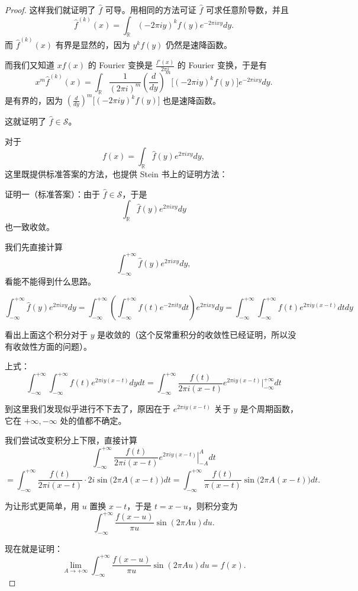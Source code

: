 \documentclass[12pt]{ctexart}  %
\begin{document}
\begin{proof}
这样我们就证明了 \(\hat{f}\) 可导。用相同的方法可证 \(\hat{f}\) 可求任意阶导数，并且
\[
\hat{f}^{(k)}(x) = \int_{\mathbb{R}} (-2\pi i y)^k f(y) e^{-2\pi i x y} dy.
\]
而 \(\hat{f}^{(k)}(x)\) 有界是显然的，因为 \(y^k f(y)\) 仍然是速降函数。

而我们又知道 \(x f(x)\) 的 Fourier 变换是 \(\frac{f'(x)}{2\pi i}\) 的 Fourier 变换，于是有
\[
x^m \hat{f}^{(k)}(x) = \int_{\mathbb{R}} \frac{1}{(2\pi i)^m}\left( \frac{d}{dy} \right)^m \bigl[ (-2\pi i y)^k f(y) \bigr] e^{-2\pi i x y} dy.
\]
是有界的，因为 \(\left( \frac{d}{dy} \right)^m \bigl[ (-2\pi i y)^k f(y) \bigr]\) 也是速降函数。

这就证明了 \(\hat{f} \in \mathcal{S}\)。

对于
\[
f(x) = \int_{\mathbb{R}} \hat{f}(y) e^{2\pi i x y} dy,
\]
这里既提供标准答案的方法，也提供 Stein 书上的证明方法：

证明一（标准答案）：由于 \(\hat{f} \in \mathcal{S}\)，于是
\[
\int_{\mathbb{R}} \hat{f}(y) e^{2\pi i x y} dy
\]
也一致收敛。

我们先直接计算
\[
\int_{-\infty}^{+\infty} \hat{f}(y) e^{2\pi i x y} dy,
\]
看能不能得到什么思路。

\[
\int_{-\infty}^{+\infty} \hat{f}(y) e^{2\pi i x y} dy
= \int_{-\infty}^{+\infty} \left( \int_{-\infty}^{+\infty} f(t) e^{-2\pi i t y} dt \right) e^{2\pi i x y} dy
= \int_{-\infty}^{+\infty} \int_{-\infty}^{+\infty} f(t) e^{2\pi i y (x-t)} dt dy
\]

看出上面这个积分对于 \(y\) 是收敛的（这个反常重积分的收敛性已经证明，所以没有收敛性方面的问题）。

上式：
\[
\int_{-\infty}^{+\infty} \int_{-\infty}^{+\infty} f(t) e^{2\pi i y (x-t)} dy dt
= \int_{-\infty}^{+\infty} \frac{f(t)}{2\pi i (x-t)} e^{2\pi i y (x-t)} \bigg|_{-\infty}^{+\infty} dt
\]

到这里我们发现似乎进行不下去了，原因在于 \(e^{2\pi i y (x-t)}\) 关于 \(y\) 是个周期函数，它在 \(+\infty, -\infty\) 处的值都不确定。

我们尝试改变积分上下限，直接计算
\[
\int_{-\infty}^{+\infty} \frac{f(t)}{2\pi i (x-t)} \left. e^{2\pi i y (x-t)} \right|_{-A}^{A} dt
\]
\[
= \int_{-\infty}^{+\infty} \frac{f(t)}{2\pi i (x-t)} \cdot 2i\sin\bigl(2\pi A (x-t)\bigr) dt
= \int_{-\infty}^{+\infty} \frac{f(t)}{\pi (x-t)} \sin\bigl(2\pi A (x-t)\bigr) dt.
\]

为让形式更简单，用 \(u\) 置换 \(x-t\)，于是 \(t = x-u\)，则积分变为
\[
\int_{-\infty}^{+\infty} \frac{f(x-u)}{\pi u} \sin(2\pi A u) du.
\]

现在就是证明：
\[
\lim_{A\to+\infty} \int_{-\infty}^{+\infty} \frac{f(x-u)}{\pi u} \sin(2\pi A u) du = f(x).
\]


\end{proof}
\end{document}
